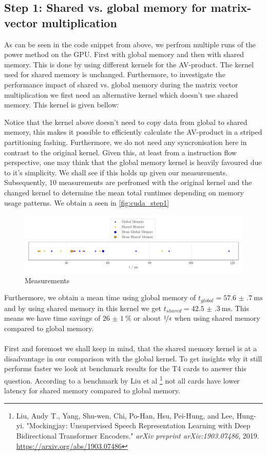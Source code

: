 \subsection{Step 1: Shared vs. global memory for matrix-vector multiplication}
As can be seen in the code snippet from above, we perfrom multiple runs of the power method on the GPU. First with global memory and then with shared memory. This is done by using different kernels for the AV-product. The kernel used for shared memory is unchanged.
Furthermore, to investigate the performance impact of shared vs. global memory during the matrix vector multiplication we first need an alternative kernel which doesn't use shared memory. This kernel is given bellow: 

Notice that the kernel above doesn't need to copy data from global to shared memory, this makes it possible to efficiently calculate the AV-product in a striped partitioning fashing. Furthermore, we do not need any syncronisation here in contrast to the original kernel. Given this, at least from a instruction flow perspective, one may think that the global memory kernel is heavily favoured due to it's simplicity. We shall see if this holds up given our measurements. \\ 
Subsequently, 10 measurements are perfromed with the original kernel and the changed kernel to determine the mean total runtimes depending on memory usage patterns. 
We obtain a  seen in \autoref{fig:cuda_step1}
\begin{figure}[H]
    \centering
    \includegraphics[width=\textwidth]{../fig/lab3/step1.png}
    \caption{Measurements }
    \label{fig:cuda_step1}
\end{figure}
Furthermore, we obtain a mean time using global memory of $t_{global} = \SI{57.6(7)}{\milli\second}$ and by using shared memory in this kernel we get $t_{shared} = \SI{42.5(3)}{\milli\second}$. 
This means we have time savings of $\SI{26(1)}{\percent}$ or about $\nicefrac{1}{4}$ when using shared memory compared to global memory. \\
\\
First and foremost we shall keep in mind, that the shared memory kernel is at a disadvantage in our comparison with the global kernel. To get insights why it still performs faster we look at benchmark results for the T4 cards to answer this question. According to a benchmark by Liu et al \footnote{Liu, Andy T., Yang, Shu-wen, Chi, Po-Han, Hsu, Pei-Hung, and Lee, Hung-yi. 
"Mockingjay: Unsupervised Speech Representation Learning with Deep Bidirectional Transformer Encoders." 
\textit{arXiv preprint arXiv:1903.07486}, 2019. \url{https://arxiv.org/abs/1903.07486}} not all cards have lower latency for shared memory compared to global memory. 

